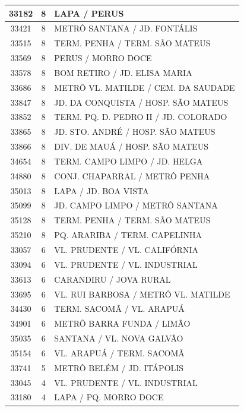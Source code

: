 \documentclass[
	12pt,				%
	oneside,			%
	a4paper,			%
	english,			%
	brazil				%
	]{abntex2ppgsi}
\begin{document}
\begin{apendicesenv}
\begin{longtable}{c|c|p{7cm}}
\hline
    33182 & 8     & LAPA / PERUS \\
\hline
    33421 & 8     & METRÔ SANTANA / JD. FONTÁLIS \\
\hline
    33515 & 8     & TERM. PENHA / TERM. SÃO MATEUS \\
\hline
    33569 & 8     & PERUS / MORRO DOCE \\
\hline
    33578 & 8     & BOM RETIRO / JD. ELISA MARIA \\
\hline
    33686 & 8     & METRÔ VL. MATILDE / CEM. DA SAUDADE \\
\hline
    33847 & 8     & JD. DA CONQUISTA / HOSP. SÃO MATEUS \\
\hline
    33852 & 8     & TERM. PQ. D. PEDRO II / JD. COLORADO \\
\hline
    33865 & 8     & JD. STO. ANDRÉ / HOSP. SÃO MATEUS \\
\hline
    33866 & 8     & DIV. DE MAUÁ / HOSP. SÃO MATEUS \\
\hline
    34654 & 8     & TERM. CAMPO LIMPO / JD. HELGA \\
\hline
    34880 & 8     & CONJ. CHAPARRAL / METRÔ PENHA \\
\hline
    35013 & 8     & LAPA / JD. BOA VISTA \\
\hline
    35099 & 8     & JD. CAMPO LIMPO / METRÔ SANTANA \\
\hline
    35128 & 8     & TERM. PENHA / TERM. SÃO MATEUS \\
\hline
    35210 & 8     & PQ. ARARIBA / TERM. CAPELINHA \\
\hline
    33057 & 6     & VL. PRUDENTE / VL. CALIFÓRNIA \\
\hline
    33094 & 6     & VL. PRUDENTE / VL. INDUSTRIAL \\
\hline
    33613 & 6     & CARANDIRU / JOVA RURAL \\
\hline
    33695 & 6     & VL. RUI BARBOSA / METRÔ VL. MATILDE \\
\hline
    34430 & 6     & TERM. SACOMÃ / VL. ARAPUÁ \\
\hline
    34901 & 6     & METRÔ BARRA FUNDA / LIMÃO \\
\hline
    35035 & 6     & SANTANA / VL. NOVA GALVÃO \\
\hline
    35154 & 6     & VL. ARAPUÁ / TERM. SACOMÃ \\
\hline
    33741 & 5     & METRÔ BELÉM / JD. ITÁPOLIS \\
\hline
    33045 & 4     & VL. PRUDENTE / VL. INDUSTRIAL \\
\hline
    33180 & 4     & LAPA / PQ. MORRO DOCE \\

\end{longtable}
\end{apendicesenv}
\end{document}
